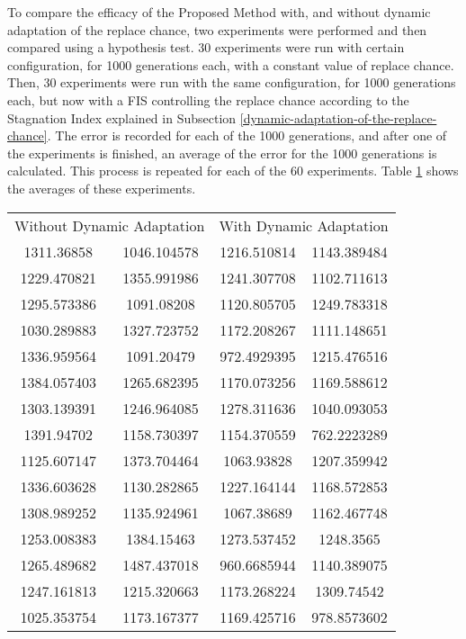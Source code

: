 To compare the efficacy of the Proposed Method with, and without dynamic adaptation of the replace chance, two experiments were performed and then compared using a hypothesis test. 30 experiments were run with certain configuration, for 1000 generations each, with a constant value of replace chance. Then, 30 experiments were run with the same configuration, for 1000 generations each, but now with a FIS controlling the replace chance according to the Stagnation Index explained in Subsection \ref{dynamic-adaptation-of-the-replace-chance}. The error is recorded for each of the 1000 generations, and after one of the experiments is finished, an average of the error for the 1000 generations is calculated. This process is repeated for each of the 60 experiments. Table \ref{dynamic-vs-non-dynamic-table} shows the averages of these experiments.

\begin{table}
    \label{dynamic-vs-non-dynamic-table}
    \begin{tabular}{ c c | c c}
        \multicolumn{2}{c}{Without Dynamic Adaptation} & \multicolumn{2}{c}{With Dynamic Adaptation} \\ 
         1311.36858  & 1046.104578 & 1216.510814 & 1143.389484 \\ 
         1229.470821 & 1355.991986 & 1241.307708 & 1102.711613 \\ 
         1295.573386 & 1091.08208  & 1120.805705 & 1249.783318 \\ 
         1030.289883 & 1327.723752 & 1172.208267 & 1111.148651 \\ 
         1336.959564 & 1091.20479  & 972.4929395 & 1215.476516 \\ 
         1384.057403 & 1265.682395 & 1170.073256 & 1169.588612 \\ 
         1303.139391 & 1246.964085 & 1278.311636 & 1040.093053 \\ 
         1391.94702  & 1158.730397 & 1154.370559 & 762.2223289 \\ 
         1125.607147 & 1373.704464 & 1063.93828  & 1207.359942 \\ 
         1336.603628 & 1130.282865 & 1227.164144 & 1168.572853 \\
         1308.989252 & 1135.924961 & 1067.38689  & 1162.467748 \\
         1253.008383 & 1384.15463  & 1273.537452 & 1248.3565   \\
         1265.489682 & 1487.437018 & 960.6685944 & 1140.389075 \\
         1247.161813 & 1215.320663 & 1173.268224 & 1309.74542  \\
         1025.353754 & 1173.167377 & 1169.425716 & 978.8573602 \\
    \end{tabular} 
\end{table}

